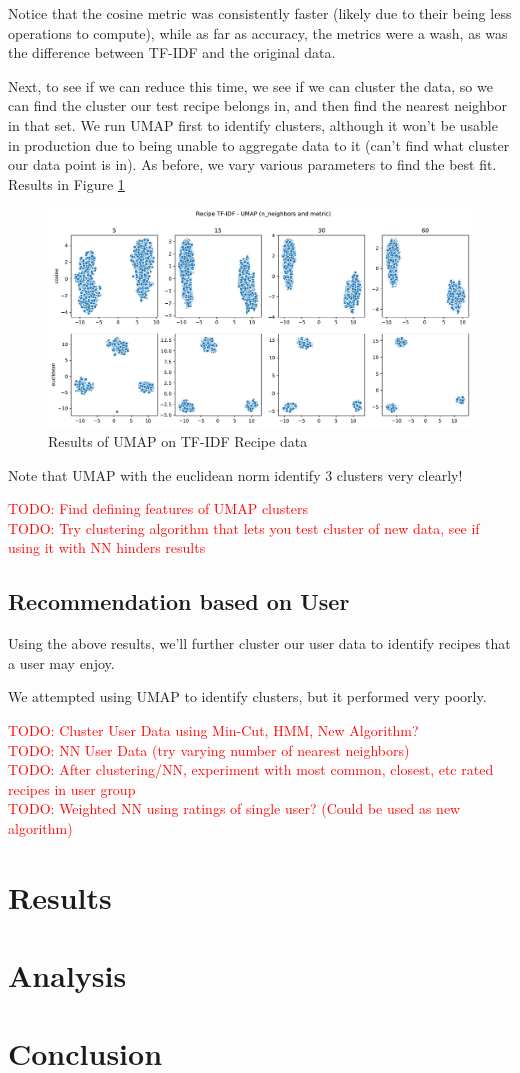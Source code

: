 \documentclass[11pt]{article}
\newcommand\todo[1]{\textcolor{red}{TODO: #1 \\}}
\begin{document}
Notice that the cosine metric was consistently faster (likely due to their being less operations to compute), while as far as accuracy, the metrics were a wash, as was the difference between TF-IDF and the original data.

Next, to see if we can reduce this time, we see if we can cluster the data, so we can find the cluster our test recipe belongs in, and then find the nearest neighbor in that set. We run UMAP first to identify clusters, although it won't be usable in production due to being unable to aggregate data to it (can't find what cluster our data point is in). As before, we vary various parameters to find the best fit. Results in Figure \ref{fig:recipe_umap}

\begin{figure}[t]
\centering
\includegraphics[width=1\textwidth]{figs/recipeUMAP_tfidf.pdf}
\caption{Results of UMAP on TF-IDF Recipe data}
\label{fig:recipe_umap}
\end{figure}

Note that UMAP with the euclidean norm identify 3 clusters very clearly!

\todo{Find defining features of UMAP clusters}
\todo{Try clustering algorithm that lets you test cluster of new data, see if using it with NN hinders results}
\subsection{Recommendation based on User}
Using the above results, we'll further cluster our user data to identify recipes that a user may enjoy.

We attempted using UMAP to identify clusters, but it performed very poorly.

\todo{Cluster User Data using Min-Cut, HMM, New Algorithm?}
\todo{NN User Data (try varying number of nearest neighbors)}
\todo{After clustering/NN, experiment with most common, closest, etc rated recipes in user group}
\todo{Weighted NN using ratings of single user? (Could be used as new algorithm)}

\section{Results}

\section{Analysis}

\section{Conclusion}



\end{document}
